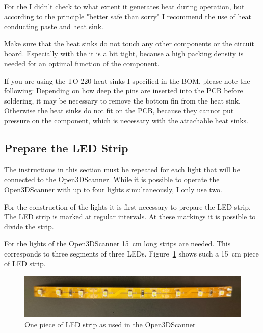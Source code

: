 For the  I didn't check to what extent it generates heat during operation, but according to the principle "better safe than sorry" I recommend the use of heat conducting paste and heat sink.%

Make sure that the heat sinks do not touch any other components or the circuit board. Especially with the  it is a bit tight, because a high packing density is needed for an optimal function of the component.%

If you are using the TO-220 heat sinks I specified in the BOM, please note the following: Depending on how deep the pins are inserted into the PCB before soldering, it may be necessary to remove the bottom fin from the heat sink. Otherwise the heat sinks do not fit on the PCB, because they cannot put pressure on the component, which is necessary with the attachable heat sinks.%

\subsection{Prepare the LED Strip}%
The instructions in this section must be repeated for each light that will be connected to the Open3DScanner. While it is possible to operate the Open3DScanner with up to four lights simultaneously, I only use two.%

For the construction of the lights it is first necessary to prepare the LED strip. The LED strip is marked at regular intervals. At these markings it is possible to divide the strip.%

For the lights of the Open3DScanner \SI{15}{\centi\meter} long strips are needed. This corresponds to three segments of three LEDs. Figure~\ref{fig:ledStrip} shows such a \SI{15}{\centi\meter} piece of LED strip.%

\begin{figure}[ht!]%
	\includegraphics[width=\linewidth]{images/LedStrip.jpg}%
	\caption{One piece of LED strip as used in the Open3DScanner}%
	\label{fig:ledStrip}%
\end{figure}%

